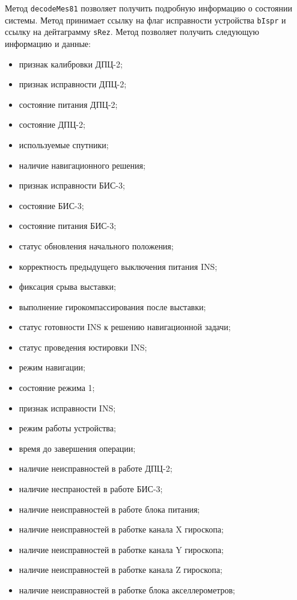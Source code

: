 \begin{enum}
	\item Метод \texttt{decodeMes81} позволяет получить подробную информацию о состоянии системы. Метод принимает
		ссылку на флаг исправности устройства \texttt{bIspr} и ссылку на дейтаграмму \texttt{sRez}.
		Метод позволяет получить следующую информацию и данные:
		\begin{itemize}
			\item признак калибровки ДПЦ-2;
			\item признак исправности ДПЦ-2;
			\item состояние питания ДПЦ-2;
			\item состояние ДПЦ-2;
			\item используемые спутники;
			\item наличие навигационного решения;
			\item признак исправности БИС-3;
			\item состояние БИС-3;
			\item состояние питания БИС-3;
			\item статус обновления начального положения;
			\item корректность предыдущего выключения питания INS;
			\item фиксация срыва выставки;
			\item выполнение гирокомпассирования после выставки;
			\item статус готовности INS к решению навигационной задачи;
			\item статус проведения юстировки INS;
			\item режим навигации;
			\item состояние режима 1;
			\item признак исправности INS;
			\item режим работы устройства;
			\item время до завершения операции;
			\item наличие неисправностей в работе ДПЦ-2;
			\item наличие неспраностей в работе БИС-3;
			\item наличие неисправностей в работе блока питания;
			\item наличие неисправностей в работке канала X гироскопа;
			\item наличие неисправностей в работке канала Y гироскопа;
			\item наличие неисправностей в работке канала Z гироскопа;
			\item наличие неисправностей в работке блока акселлерометров;
		\end{itemize}


\end{enum}
